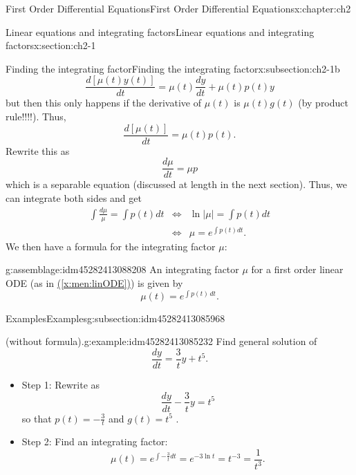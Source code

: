 \documentclass[oneside,10pt,]{book}
\numberwithin{equation}{section}
\numberwithin{equation}{section}
\newcommand{\amp}{&}
\begin{document}
\begin{chapterptx}{First Order Differential Equations}{}{First Order Differential Equations}{}{}{x:chapter:ch2}
\begin{sectionptx}{Linear equations and integrating factors}{}{Linear equations and integrating factors}{}{}{x:section:ch2-1}
\begin{subsectionptx}{Finding the integrating factor}{}{Finding the integrating factor}{}{}{x:subsection:ch2-1b}
\begin{equation*}
\frac{d\left[\mu(t)y(t)\right]}{dt}=\mu(t)\frac{dy}{dt}+\mu(t)p(t)y
\end{equation*}
but then this only happens if the derivative of \(\mu(t)\) is \(\mu(t)g(t)\) (by product rule!!!!). Thus,%
\begin{equation*}
\frac{d\left[\mu(t)\right]}{dt}=\mu(t)p(t).
\end{equation*}
Rewrite this as%
\begin{equation*}
\frac{d\mu}{dt}=\mu p
\end{equation*}
which is a separable equation (discussed at length in the next section). Thus, we can integrate both sides and get%
\begin{align*}
\int\frac{d\mu}{\mu}=\int p(t)dt \amp \iff \amp \ln\left|\mu\right|=\int p(t)dt\\
\amp \iff \amp \mu=e^{\int p(t)dt}.
\end{align*}
We then have a formula for the integrating factor \(\mu\):%
\begin{assemblage}{}{g:assemblage:idm45282413088208}%
An integrating factor \(\mu\) for a first order linear ODE (as in \hyperref[x:men:linODE]{(\ref{x:men:linODE})}) is given by%
\begin{equation*}
\mu(t)=e^{\int p(t)\,dt}.
\end{equation*}
%
\end{assemblage}
\end{subsectionptx}
%
%
\typeout{************************************************}
\typeout{************************************************}
%
\begin{subsectionptx}{Examples}{}{Examples}{}{}{g:subsection:idm45282413085968}
\begin{example}{(without formula).}{g:example:idm45282413085232}%
Find general solution of%
\begin{equation*}
\frac{dy}{dt}=\frac{3}{t}y+t^{5}.
\end{equation*}
%
%
\begin{itemize}[label=\textbullet]
\item{}Step 1: Rewrite as%
\begin{equation*}
\frac{dy}{dt}-\frac{3}{t}y=t^{5}
\end{equation*}
so that \(p(t)=-\frac{3}{t}\) and \(g(t)=t^{5}\)%
. \item{}Step 2: Find an integrating factor:%
\begin{equation*}
\mu(t)=e^{\int-\frac{3}{t}dt}=e^{-3\ln t}=t^{-3}=\frac{1}{t^{3}}.
\end{equation*}

\end{itemize}
\end{example}
\end{subsectionptx}
\end{sectionptx}
\end{chapterptx}
\end{document}
